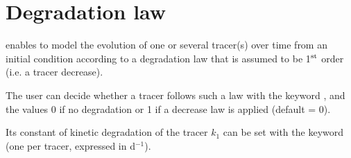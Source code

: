 \chapter{Degradation law}

\waqtel enables to model the evolution of one or several tracer(s)
over time from an initial condition according to a degradation law
that is assumed to be 1$^{\rm{st}}$ order (i.e. a tracer decrease).

The user can decide whether a tracer follows such a law
with the keyword ,
and the values 0 if no degradation or 1 if a decrease law
is applied (default = 0).

Its constant of kinetic degradation of the tracer $k_1$ can be set
with the keyword 
(one per tracer, expressed in d$^{-1}$).
